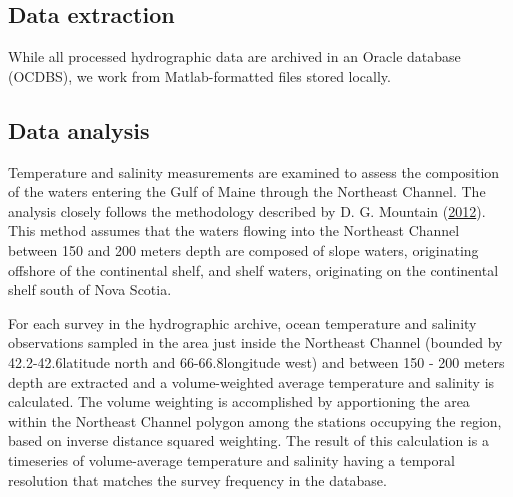 \documentclass[
]{book}
\begin{document}
\hypertarget{data-extraction-30}{%
\subsection{Data extraction}\label{data-extraction-30}}

While all processed hydrographic data are archived in an Oracle database (OCDBS), we work from Matlab-formatted files stored locally.

\hypertarget{data-analysis-35}{%
\subsection{Data analysis}\label{data-analysis-35}}

Temperature and salinity measurements are examined to assess the composition of the waters entering the Gulf of Maine through the Northeast Channel. The analysis closely follows the methodology described by D. G. Mountain (\protect\hyperlink{ref-mountain2012}{2012}). This method assumes that the waters flowing into the Northeast Channel between 150 and 200 meters depth are composed of slope waters, originating offshore of the continental shelf, and shelf waters, originating on the continental shelf south of Nova Scotia.

For each survey in the hydrographic archive, ocean temperature and salinity observations sampled in the area just inside the Northeast Channel (bounded by 42.2-42.6\textdegree latitude north and 66-66.8\textdegree longitude west) and between 150 - 200 meters depth are extracted and a volume-weighted average temperature and salinity is calculated. The volume weighting is accomplished by apportioning the area within the Northeast Channel polygon among the stations occupying the region, based on inverse distance squared weighting. The result of this calculation is a timeseries of volume-average temperature and salinity having a temporal resolution that matches the survey frequency in the database.
\end{document}

